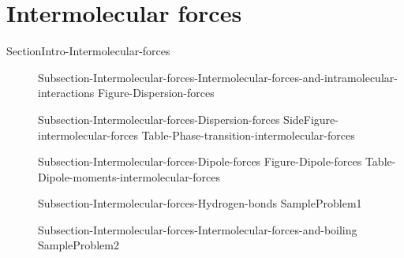 \documentclass[main.tex]{subfiles}
\newcommand\chapterlabel{Ch-naming}\setcounter{figurenewcounter}{0}\setcounter{tablenewcounter}{0}\setcounter{formulanewcounter}{0}\chapterpicture{../{\chapterlabel}/figure1}\chapterpicturelabel{Pixnio}
\begin{document}
{\section{Intermolecular forces}{SectionIntro-Intermolecular-forces}
\sloppy \begin{description}
\item[] {Subsection-Intermolecular-forces-Intermolecular-forces-and-intramolecular-interactions}
{Figure-Dispersion-forces}
\item[] {Subsection-Intermolecular-forces-Dispersion-forces}
{SideFigure-intermolecular-forces}
{Table-Phase-transition-intermolecular-forces}
\item[] {Subsection-Intermolecular-forces-Dipole-forces}
{Figure-Dipole-forces}
{Table-Dipole-moments-intermolecular-forces}
\item[] {Subsection-Intermolecular-forces-Hydrogen-bonds}
{SampleProblem1}
\item[] {Subsection-Intermolecular-forces-Intermolecular-forces-and-boiling}
{SampleProblem2}
\end{description}




\renewcommand\chapterlabel{Ch-naming}

}{}
 
 








 

 \checkoddpage\ifoddpage \clearpage\thispagestyle{empty}\mbox{}\clearpage \else  \fi 
\end{document}
